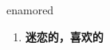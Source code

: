 
\begin{frame}
{\huge enamored}
\begin{center}
\begin{enumerate}\Large
  \item \textbf{迷恋的，喜欢的}
\end{enumerate}
\end{center}
\end{frame}
